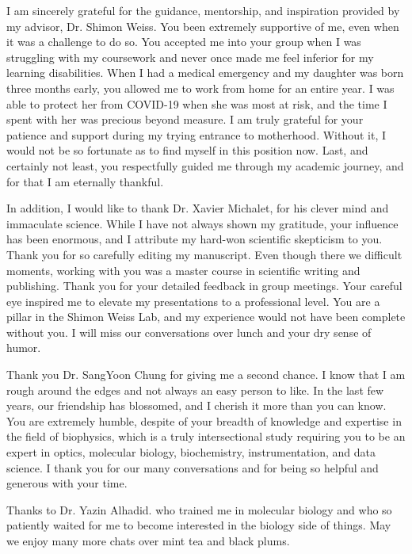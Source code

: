 \vspace*{\fill}

I am sincerely grateful for the guidance, mentorship, and inspiration provided by my advisor, Dr. Shimon Weiss. 
You been extremely supportive of me, even when it was a challenge to do so. 
You accepted me into your group when I was struggling with my coursework and never once made me feel inferior for my learning disabilities. 
When I had a medical emergency and my daughter was born three months early, 
you allowed me to work from home for an entire year.
I was able to protect her from COVID-19 when she was most at risk, and the time I spent with her was precious beyond measure.
I am truly grateful for your patience and support during my trying entrance to motherhood.
Without it, I would not be so fortunate as to find myself in this position now.
Last, and certainly not least, you respectfully guided me through my academic journey, and for that I am eternally thankful. 

In addition, I would like to thank Dr. Xavier Michalet, for his clever mind and immaculate science.
While I have not always shown my gratitude, your influence has been enormous, and I attribute my hard-won scientific skepticism to you. 
Thank you for so carefully editing my manuscript.
Even though there we difficult moments, working with you was a master course in scientific writing and publishing. 
Thank you for your detailed feedback in group meetings.
Your careful eye inspired me to elevate my presentations to a professional level.
You are a pillar in the Shimon Weiss Lab, and my experience would not have been complete without you.
I will miss our conversations over lunch and your dry sense of humor. 

Thank you Dr. SangYoon Chung for giving me a second chance. 
I know that I am rough around the edges and not always an easy person to like.
In the last few years, our friendship has blossomed, and I cherish it more than you can know. 
You are extremely humble, despite of your breadth of knowledge and expertise in the field of biophysics, which is a truly intersectional study requiring you to be an expert in optics, molecular biology, biochemistry, instrumentation, and data science. 
I thank you for our many conversations and for being so helpful and generous with your time.

Thanks to Dr. Yazin Alhadid.
who trained me in molecular biology and who so patiently waited for me to become interested in the biology side of things. 
May we enjoy many more chats over mint tea and black plums. 

